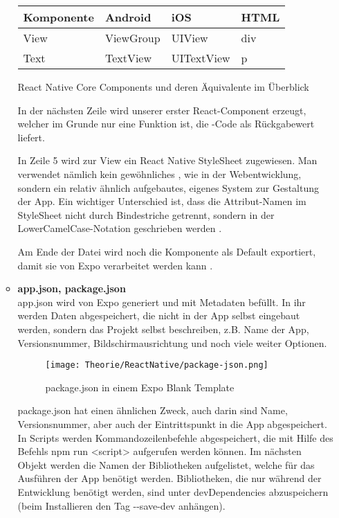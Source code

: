 \begin{itemize}
\begin{itemize}
\begin{table}[H]
\centering
\begin{tabular}{|l|l|l|l|}
  \hline
  \textbf{Komponente} & \textbf{Android} & \textbf{iOS} & \textbf{HTML} \\ \hline\hline
  View                & ViewGroup        & UIView       & div          \\
  Text                & TextView         & UITextView   & p            \\ \hline
\end{tabular}
\end{table}

\begin{center}
  React Native Core Components und deren Äquivalente im Überblick \cite{reactNativeCoreComponents}
\end{center}

In der nächsten Zeile wird unserer erster React-Component erzeugt, welcher im Grunde nur eine
Funktion ist, die -Code als Rückgabewert liefert.

In Zeile 5 wird zur View ein React Native StyleSheet zugewiesen. Man verwendet nämlich kein
gewöhnliches , wie in der Webentwicklung, sondern ein relativ ähnlich aufgebautes,
eigenes System zur Gestaltung der App. Ein wichtiger Unterschied ist, dass die Attribut-Namen im
StyleSheet nicht durch Bindestriche getrennt, sondern in der LowerCamelCase-Notation geschrieben
werden \cite{camelCaseNotation}.

Am Ende der Datei wird noch die Komponente als Default exportiert, damit sie von Expo verarbeitet
werden kann \cite{jsModules}.

\item \textbf{app.json, package.json}\\
app.json wird von Expo generiert und mit Metadaten befüllt. In ihr werden Daten abgespeichert,
die nicht in der App selbst eingebaut werden, sondern das Projekt selbst beschreiben, z.B. Name der
App, Versionsnummer, Bildschirmausrichtung und noch viele weiter Optionen.

\begin{figure}[H]
  \begin{center}
    \texttt{[image: Theorie/ReactNative/package-json.png]}
    \caption{package.json in einem Expo Blank Template}
  \end{center}
\end{figure}

package.json hat einen ähnlichen Zweck, auch darin sind Name, Versionsnummer, aber auch der
Eintrittspunkt in die App abgespeichert. In Scripts werden Kommandozeilenbefehle abgespeichert, die
mit Hilfe des Befehls npm run <script> aufgerufen werden können. Im nächsten Objekt werden die
Namen der Bibliotheken aufgelistet, welche für das Ausführen der App benötigt werden. Bibliotheken,
die nur während der Entwicklung benötigt werden, sind unter devDependencies abzuspeichern (beim
Installieren den Tag -{}-save-dev anhängen).


\end{itemize}
\end{itemize}
